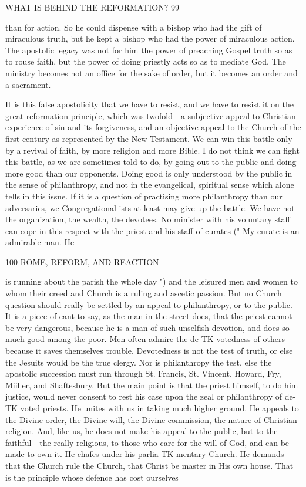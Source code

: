 \documentclass[12pt,a5paper,twoside]{book}
\begin{document}
WHAT IS BEHIND THE REFORMATION? 99 

than for action. So he could dispense with a bishop 
who had the gift of miraculous truth, but he kept 
a bishop who had the power of miraculous action. 
The apostolic legacy was not for him the power of 
preaching Gospel truth so as to rouse faith, but the 
power of doing priestly acts so as to mediate God. 
The ministry becomes not an office for the sake of 
order, but it becomes an order and a sacrament. 

It is this false apostolicity that we have to resist, 
and we have to resist it on the great reformation 
principle, which was twofold---a subjective appeal to 
Christian experience of sin and its forgiveness, and an 
objective appeal to the Church of the first century as 
represented by the New Testament. We can win 
this battle only by a revival of faith, by more religion 
and more Bible. I do not think we can fight this 
battle, as we are sometimes told to do, by going out to 
the public and doing more good than our opponents. 
Doing good is only understood by the public in the 
sense of philanthropy, and not in the evangelical, 
spiritual sense which alone tells in this issue. If it is 
a question of practising more philanthropy than our 
adversaries, we Congregational ists at least may give up 
the battle. We have not the organization, the wealth, 
the devotees. No minister with his voluntary staff 
can cope in this respect with the priest and his staff 
of curates (" My curate is an admirable man. He 



100 ROME, REFORM, AND REACTION 

is running about the parish the whole day ") 
and the leisured men and women to whom their 
creed and Church is a ruling and ascetic passion. 
But no Church question should really be settled by 
an appeal to philanthropy, or to the public. It is a 
piece of cant to say, as the man in the street does, 
that the priest cannot be very dangerous, because he 
is a man of such unselfish devotion, and does so much 
good among the poor. Men often admire the de-TK
votedness of others because it saves themselves trouble. 
Devotedness is not the test of truth, or else the Jesuits 
would be the true clergy. Nor is philanthropy the 
test, else the apostolic succession must run through 
St. Francis, St. Vincent, Howard, Fry, Miiller, 
and Shaftesbury. But the main point is that the 
priest himself, to do him justice, would never consent 
to rest his case upon the zeal or philanthropy of de-TK
voted priests. He unites with us in taking much 
higher ground. He appeals to the Divine order, the 
Divine will, the Divine commission, the nature of 
Christian religion. And, like us, he does not make 
his appeal to the public, but to the faithful---the really 
religious, to those who care for the will of God, and 
can be made to own it. He chafes under his parlia-TK
mentary Church. He demands that the Church rule 
the Church, that Christ be master in His own house. 
That is the principle whose defence has cost ourselves 
\end{document}
